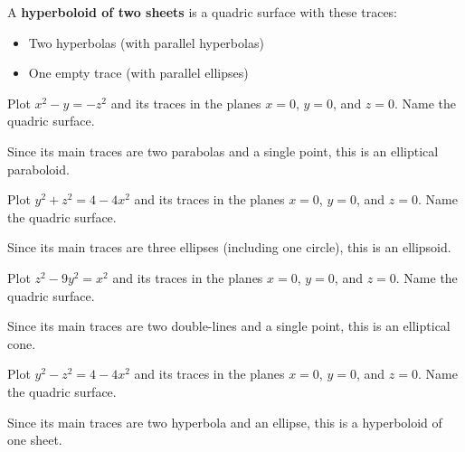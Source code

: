 \documentclass[letterpaper, twoside, 12pt]{book}
\begin{document}
\begin{definition}
  A \textbf{hyperboloid of two sheets} is a quadric surface with these traces:
    \begin{itemize}
    \item Two hyperbolas (with parallel hyperbolas)
    \item One empty trace (with parallel ellipses)
    \end{itemize}
\end{definition}

          \begin{problem}
            Plot $x^2-y=-z^2$ and its traces in the planes $x=0$, $y=0$,
            and $z=0$.
            Name the quadric surface.
          \end{problem}

          \begin{solution}
  Since its main traces are two parabolas and a single point,
  this is an elliptical paraboloid.
          \end{solution}

          \begin{problem}
            Plot $y^2+z^2=4-4x^2$ and its traces in the planes $x=0$, $y=0$,
            and $z=0$.
            Name the quadric surface.
          \end{problem}

          \begin{solution}
  Since its main traces are three ellipses (including one circle),
  this is an ellipsoid.
          \end{solution}

          \begin{problem}
            Plot $z^2-9y^2=x^2$ and its traces in the planes $x=0$, $y=0$,
            and $z=0$.
            Name the quadric surface.
          \end{problem}

          \begin{solution}
  Since its main traces are two double-lines and a single point,
  this is an elliptical cone.
          \end{solution}

          \begin{problem}
            Plot $y^2-z^2=4-4x^2$ and its traces in the planes $x=0$, $y=0$,
            and $z=0$.
            Name the quadric surface.
          \end{problem}

          \begin{solution}
  Since its main traces are two hyperbola and an ellipse,
  this is a hyperboloid of one sheet.
          \end{solution}
\end{document}
